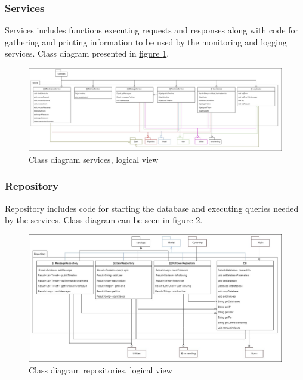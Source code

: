 \subsubsection{Services}
Services includes functions executing requests and responses along with code for gathering and printing information to be used by the monitoring and logging services.
Class diagram presented in \hyperref[fig:classDiagramServices]{figure \ref{fig:classDiagramServices}}.
 \begin{figure}[H]
    \centering
    \hspace*{-1.5in}
    \includegraphics[width=1.6\textwidth]{images/class_diagram_services.jpg}
    \caption{Class diagram services, logical view}
    \label{fig:classDiagramServices}
\end{figure}

\subsubsection{Repository}
Repository includes code for starting the database and executing queries needed by the services. Class diagram can be seen in \hyperref[fig:classDiagramRepository]{figure \ref{fig:classDiagramRepository}}.
\begin{figure}[H]
    \centering
    \hspace*{-1.3in}
    \includegraphics[width=1.55\textwidth]{images/class_diagram_repository.jpg}
    \caption{Class diagram repositories, logical view}
    \label{fig:classDiagramRepository}
\end{figure}

